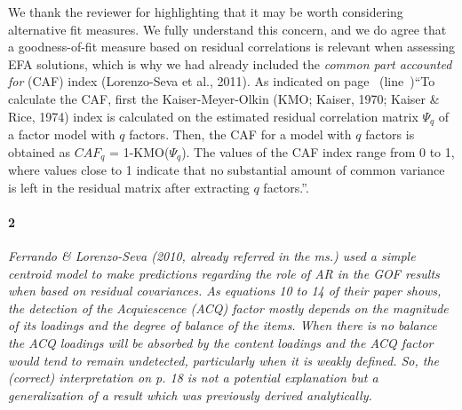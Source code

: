\documentclass[a4paper]{article}
\begin{document}
We thank the reviewer for highlighting that it may be worth considering alternative fit measures. We fully understand this concern, and we do agree that a goodness-of-fit measure based on residual correlations is relevant when assessing EFA solutions, which is why we had already included the \textit{common part accounted for} (CAF) index (Lorenzo-Seva et al., 2011). As indicated on page~\pageref{refpage:R2Mj1a} (line~)\textquotedblleft To calculate the CAF, first the Kaiser-Meyer-Olkin (KMO; Kaiser, 1970; Kaiser \& Rice, 1974) index is calculated on the estimated residual correlation matrix $\Psi_{q}$ of a factor model with $q$ factors. Then, the CAF for a model with $q$ factors is obtained as $CAF_{q}$ = 1-KMO($\Psi_{q}$). The values of the CAF index range from 0 to 1, where values close to 1 indicate that no substantial amount of common variance is left in the residual matrix after extracting $q$ factors.\textquotedblright. 



\paragraph{2} \textit{Ferrando \& Lorenzo-Seva (2010, already referred in the ms.) used a simple centroid model to make predictions regarding the role of AR in the GOF results when based on residual covariances. As equations 10 to 14 of their paper shows, the detection of the Acquiescence (ACQ) factor mostly depends on the magnitude of its loadings and the degree of balance of the items. When there is no balance the ACQ loadings will be absorbed by the content loadings and the ACQ factor would tend to remain undetected, particularly when it is weakly defined. So, the (correct) interpretation on p. 18 is not a potential explanation but a generalization of a result which was previously derived analytically.}
\end{document}
